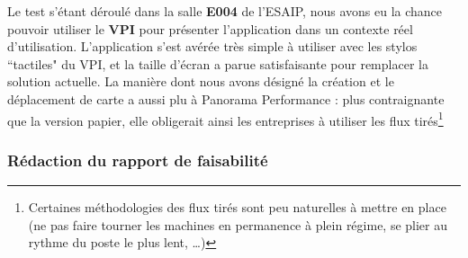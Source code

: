 Le test s'étant déroulé dans la salle \textbf{E004} de l'ESAIP, nous avons eu la chance pouvoir utiliser le \textbf{VPI} pour présenter l'application dans un contexte réel d'utilisation. L'application s'est avérée très simple à utiliser avec les stylos “tactiles" du VPI, et la taille d'écran a parue satisfaisante pour remplacer la solution actuelle. La manière dont nous avons désigné la création et le déplacement de carte a aussi plu à Panorama Performance : plus contraignante que la version papier, elle obligerait ainsi les entreprises à utiliser les flux tirés\footnote{Certaines méthodologies des flux tirés sont peu naturelles à mettre en place (ne pas faire tourner les machines en permanence à plein régime, se plier au rythme du poste le plus lent, \dots )}




\subsubsection*{Rédaction du rapport de faisabilité}



